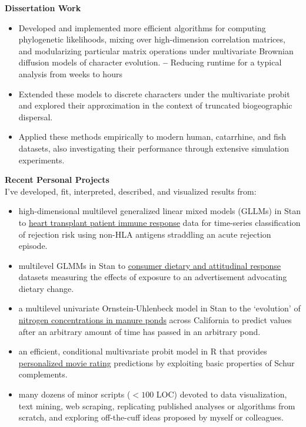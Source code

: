\documentclass[11pt,margin,line]{resume}
\begin{document}
\begin{resume}
\textbf{Dissertation Work}
\begin{itemize}[noitemsep]
\item Developed and implemented more efficient algorithms for computing phylogenetic likelihoods, mixing over high-dimension correlation matrices, and modularizing particular matrix operations under multivariate Brownian diffusion models of character evolution.
\subitem \textbf{--} Reducing runtime for a typical analysis from weeks to hours
\item Extended these models to discrete characters under the multivariate probit and explored their approximation in the context of truncated biogeographic dispersal. 
\item Applied these methods empirically to modern human, catarrhine, and fish datasets, also investigating their performance through extensive simulation experiments. 
\end{itemize}

\textbf{Recent Personal Projects}\\
I've developed, fit, interpreted, described, and visualized results from:
\begin{itemize}[noitemsep]
\item high-dimensional multilevel generalized linear mixed models (GLLMs) in Stan to \ul{heart transplant patient immune response} data for time-series classification of rejection risk using non-HLA antigens straddling an acute rejection episode.
\item multilevel GLMMs in Stan to \ul{consumer dietary and attitudinal response} datasets measuring the effects of exposure to an advertisement advocating dietary change.
\item a multilevel univariate Ornstein-Uhlenbeck model in Stan to the `evolution' of \ul{nitrogen concentrations in manure ponds} across California to predict values after an arbitrary amount of time has passed in an arbitrary pond.
\item an efficient, conditional multivariate probit model in R that provides \ul{personalized movie rating} predictions by exploiting basic properties of Schur complements.
\item many dozens of minor scripts ($<100$ LOC) devoted to data visualization, text mining, web scraping, replicating published analyses or algorithms from scratch, and exploring off-the-cuff ideas proposed by myself or colleagues.
\end{itemize}
\vspace{-1.5mm}


\end{resume}
\end{document}
